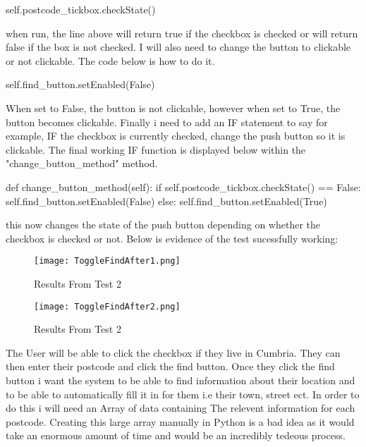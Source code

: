 \begin{python}
self.postcode_tickbox.checkState()
\end{python}

when run, the line above will return true if the checkbox is checked or will return false if the box is not checked. I will also need to change the button to clickable or not clickable. The code below is how to do it.

\begin{python}
self.find_button.setEnabled(False)
\end{python}

When set to False, the button is not clickable, however when set to True, the button becomes clickable. Finally i need to add an IF statement to say for example, IF the checkbox is currently checked, change the push button so it is clickable. The final working IF function is displayed below within the "change_button_method" method.

\begin{python}
def change_button_method(self):
        if self.postcode_tickbox.checkState() == False:
            self.find_button.setEnabled(False)
        else:
            self.find_button.setEnabled(True)
\end{python}

this now changes the state of the push button depending on whether the checkbox is checked or not. Below is evidence of the test sucessfully working:

\begin{figure}[H]
\caption{Results From Test 2} \label{fig:Results From Test 2}
\hfill\texttt{[image: ToggleFindAfter1.png]}\hspace*{\fill}
\end{figure}

\begin{figure}[H]
\caption{Results From Test 2} \label{fig:Results From Test 2}
\hfill\texttt{[image: ToggleFindAfter2.png]}\hspace*{\fill}
\end{figure}

The User will be able to click the checkbox if they live in Cumbria. They can then enter their postcode and click the find button. Once they click the find button i want the system to be able to find information about their location and to be able to automatically fill it in for them i.e their town, street ect. In order to do this i will need an Array of data containing The relevent information for each postcode. Creating this large array manually in Python is a bad idea as it would take an enormous amount of time and would be an incredibly tedeous process.

